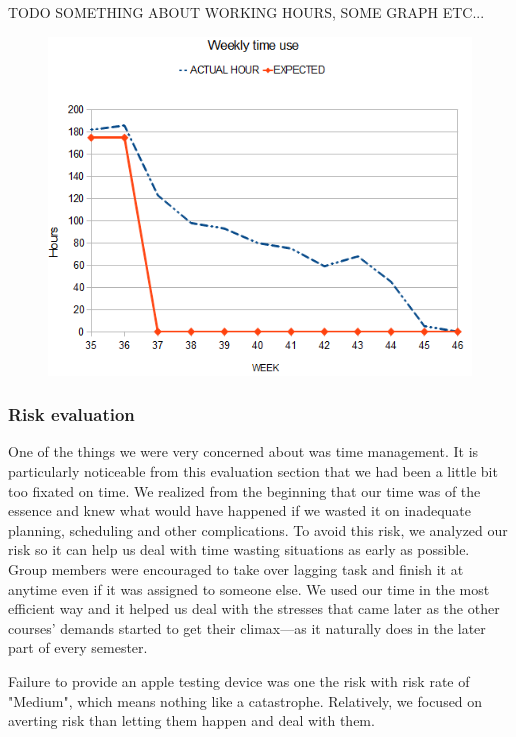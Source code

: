 	TODO SOMETHING ABOUT WORKING HOURS, SOME GRAPH ETC...

    \begin{figure}[htb]
        \centering
        \includegraphics[scale=0.88]{timebudget.png}
        \label{fig:time}
    \end{figure}
 \subsubsection{Risk evaluation} 
 One of the things we were very concerned about was time management. It is particularly noticeable from this evaluation section that we had been a little bit too fixated on time. We realized from the beginning that our time was of the essence and knew what would have happened if we wasted it on inadequate planning, scheduling and other complications. To avoid this risk, we analyzed our risk so it can help us deal with time wasting situations as early as possible. Group members were encouraged to take over lagging task and finish it at anytime even if it was assigned to someone else. We used our time in the most efficient way and it helped us deal with the stresses that came later as the other courses' demands started to get their climax---as it naturally does in the later part of every semester. 
 
 Failure to provide an apple testing device was one the risk with risk rate of "Medium", which means nothing like a catastrophe. Relatively, we focused on averting risk than letting them happen and deal with them.
	
